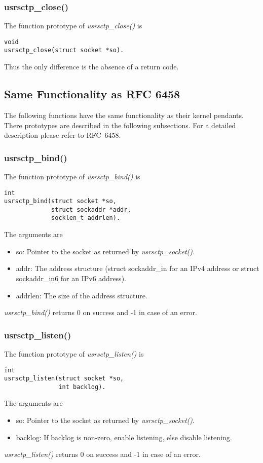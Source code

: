 \documentclass[a4paper]{article}
\begin{document}
\subsubsection{usrsctp\_close()}

The function prototype of \textit{usrsctp\_close()} is 
\begin{verbatim}   
void
usrsctp_close(struct socket *so).
 \end{verbatim}
Thus the only difference is the absence of a return code. 
 
\subsection{Same Functionality as RFC 6458}
The following functions have the same functionality as their kernel pendants. There prototypes
are described in the following subsections. For a detailed description please refer to RFC~6458.

\subsubsection{usrsctp\_bind()}
The function prototype of \textit{usrsctp\_bind()} is 
\begin{verbatim}
int
usrsctp_bind(struct socket *so,
             struct sockaddr *addr,
             socklen_t addrlen).
\end{verbatim}     
The arguments are
\begin{itemize}
\item so: Pointer to the socket as returned by \textit{usrsctp\_socket()}.
\item addr: The address structure (struct sockaddr\_in for an IPv4 address
      or struct sockaddr\_in6 for an IPv6 address).
\item addrlen: The size of the address structure.
\end{itemize}
\textit{usrsctp\_bind()} returns 0 on success and -1 in case of an error.

\subsubsection{usrsctp\_listen()}
The function prototype of \textit{usrsctp\_listen()} is 
\begin{verbatim}
int
usrsctp_listen(struct socket *so,
               int backlog).
 \end{verbatim}      
The arguments are
\begin{itemize}
\item so: Pointer to the socket as returned by \textit{usrsctp\_socket()}.
\item backlog: If backlog is non-zero, enable listening, else disable
      listening.
\end{itemize}
\textit{usrsctp\_listen()} returns 0 on success and -1 in case of an error.
\end{document}
